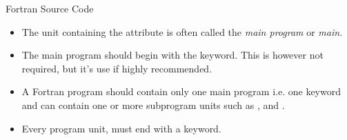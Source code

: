 \documentclass[10pt,t]{beamer}
\begin{document}
\begin{frame}{Fortran Source Code}
\begin{itemize}
      \begin{itemize}
        \item {}
        \item {}
        \item {}
        \item {}
      \end{itemize}
    \item The unit containing the  attribute is often called the {\em main program} or {\em main}.
    \item The main program should begin with the  keyword. This is however not required, but it's use if highly recommended.
    \item A Fortran program should contain only one main program i.e. one  keyword and can contain one or more subprogram units such as ,  and .
    \item Every program unit, must end with a  keyword.
  \end{itemize}


\end{frame}
\end{document}
